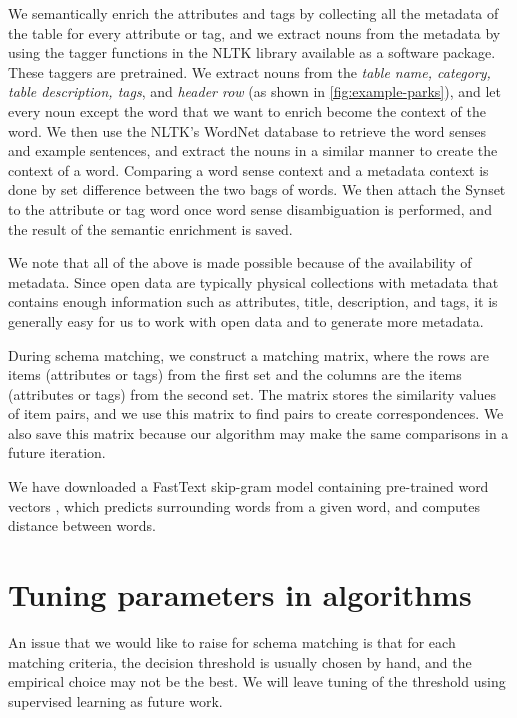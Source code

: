 We semantically enrich the attributes and tags by collecting all the metadata of the table for every attribute or tag, and we extract nouns from the metadata by using the tagger functions in the NLTK library \cite{loper-bird-2002-nltk} available as a software package. These taggers are pretrained. We extract nouns from the \textit{table name, category, table description, tags}, and \textit{header row} (as shown in \autoref{fig:example-parks}), and let every noun except the word that we want to enrich become the context of the word. We then use the NLTK's WordNet database to retrieve the word senses and example sentences, and extract the nouns in a similar manner to create the context of a word. Comparing a word sense context and a metadata context is done by set difference between the two bags of words. We then attach the Synset to the attribute or tag word once word sense disambiguation is performed, and the result of the semantic enrichment is saved.

We note that all of the above is made possible because of the availability of metadata. Since open data are typically physical collections with metadata that contains enough information \cite{Rahm2016Case} such as attributes, title, description, and tags, it is generally easy for us to work with open data and to generate more metadata.

During schema matching, we construct a matching matrix, where the rows are items (attributes or tags) from the first set and the columns are the items (attributes or tags) from the second set. The matrix stores the similarity values of item pairs, and we use this matrix to find pairs to create correspondences. We also save this matrix because our algorithm may make the same comparisons in a future iteration.

We have downloaded a FastText skip-gram model containing pre-trained word vectors \cite{mikolov-etal-2018-advances}, which predicts surrounding words from a given word, and computes distance between words.

\section{Tuning parameters in algorithms}
\label{sec:TuningParametersInAlgorithms}

An issue that we would like to raise for schema matching is that for each matching criteria, the decision threshold is usually chosen by hand, and the empirical choice may not be the best. We will leave tuning of the threshold using supervised learning as future work.

